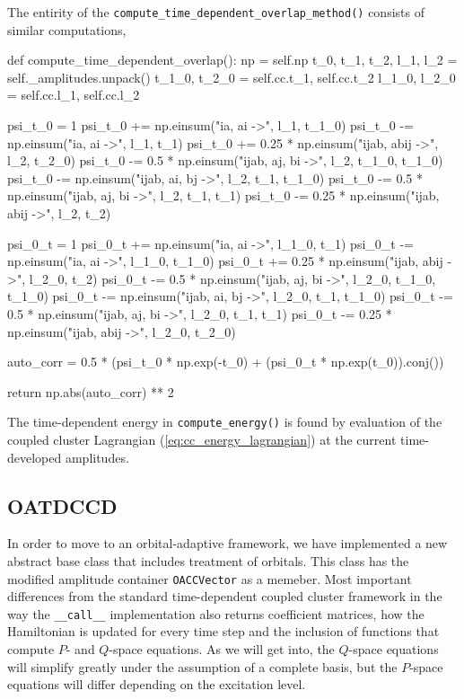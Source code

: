     The entirity of the \lstinline{compute_time_dependent_overlap_method()} consists of
    similar computations,
    \begin{python}
    def compute_time_dependent_overlap():
        np = self.np
        t_0, t_1, t_2, l_1, l_2 = self._amplitudes.unpack()
        t_1_0, t_2_0 = self.cc.t_1, self.cc.t_2 
        l_1_0, l_2_0 = self.cc.l_1, self.cc.l_2

        psi_t_0 = 1
        psi_t_0 += np.einsum("ia, ai ->", l_1, t_1_0)
        psi_t_0 -= np.einsum("ia, ai ->", l_1, t_1)
        psi_t_0 += 0.25 * np.einsum("ijab, abij ->", l_2, t_2_0)
        psi_t_0 -= 0.5 * np.einsum("ijab, aj, bi ->", l_2, t_1_0, t_1_0)
        psi_t_0 -= np.einsum("ijab, ai, bj ->", l_2, t_1, t_1_0)
        psi_t_0 -= 0.5 * np.einsum("ijab, aj, bi ->", l_2, t_1, t_1)
        psi_t_0 -= 0.25 * np.einsum("ijab, abij ->", l_2, t_2)
    
        psi_0_t = 1
        psi_0_t += np.einsum("ia, ai ->", l_1_0, t_1)
        psi_0_t -= np.einsum("ia, ai ->", l_1_0, t_1_0)
        psi_0_t += 0.25 * np.einsum("ijab, abij ->", l_2_0, t_2)
        psi_0_t -= 0.5 * np.einsum("ijab, aj, bi ->", l_2_0, t_1_0, t_1_0)
        psi_0_t -= np.einsum("ijab, ai, bj ->", l_2_0, t_1, t_1_0)
        psi_0_t -= 0.5 * np.einsum("ijab, aj, bi ->", l_2_0, t_1, t_1)
        psi_0_t -= 0.25 * np.einsum("ijab, abij ->", l_2_0, t_2_0)
    
        auto_corr = 0.5 * (psi_t_0 * np.exp(-t_0) + (psi_0_t * np.exp(t_0)).conj())

        return np.abs(auto_corr) ** 2
    \end{python}

    The time-dependent energy in \lstinline{compute_energy()} is found by evaluation of 
    the coupled cluster Lagrangian (\autoref{eq:cc_energy_lagrangian}) at the current 
    time-developed amplitudes.

    \subsection{OATDCCD}

    In order to move to an orbital-adaptive framework, we have implemented a new abstract 
    base class that includes treatment of orbitals. This class has the modified 
    amplitude container \lstinline{OACCVector} as a memeber. Most important differences 
    from the standard time-dependent coupled cluster framework in the way the 
    \lstinline{__call__} implementation also returns coefficient matrices, how the 
    Hamiltonian is updated for every time step and the inclusion of functions that 
    compute $P$- and $Q$-space equations. As we will get into, the $Q$-space equations 
    will simplify greatly under the assumption of a complete basis, but the $P$-space 
    equations will differ depending on the excitation level.

